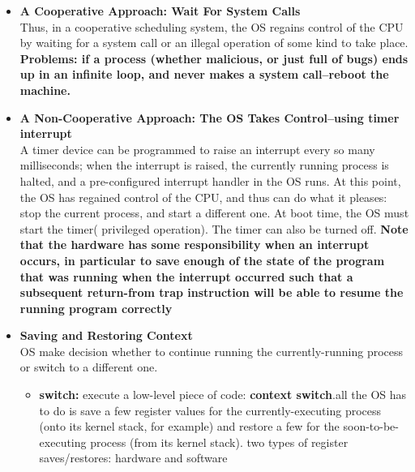 \documentclass{article}
\begin{document}
\begin{itemize}
    \item \textbf{A Cooperative Approach: Wait For System Calls}\\Thus, in a cooperative scheduling system, the OS regains control of the CPU by waiting for a system call or an illegal operation of some kind to take place. \textbf{\color{red}Problems: if a process (whether malicious, or just full of bugs) ends up in an infinite loop, and never makes a system call--reboot the machine.}
    
    \item \textbf{A Non-Cooperative Approach: The OS Takes Control--using timer interrupt}\\A timer device can be programmed to raise an interrupt every so many milliseconds; when the interrupt is raised, the currently running process is halted, and a pre-configured interrupt handler in the OS runs. At this point, the OS has regained control of the CPU, and thus can do what it pleases: stop the current process, and start a different one. At boot time, the OS must start the timer(
   privileged operation). The timer can also be turned off. \textbf{\color{red}Note that the hardware has some responsibility when an interrupt occurs, in particular to save enough of the state of the program that was running when the interrupt occurred such that a subsequent return-from trap instruction will be able to resume the running program correctly}
   
   \item \textbf{Saving and Restoring Context}\\
   OS make decision whether to continue running the currently-running process or switch to a different one.
   \begin{itemize}
       \item \textbf{switch: }execute a low-level piece of code: \textbf{\color{red} context switch}.all the OS has to do is save a few register values
for the currently-executing process (onto its kernel stack, for example)
and restore a few for the soon-to-be-executing process (from its kernel
stack). two types of register saves/restores: hardware and software
   \end{itemize}
\end{itemize}
\end{document}
